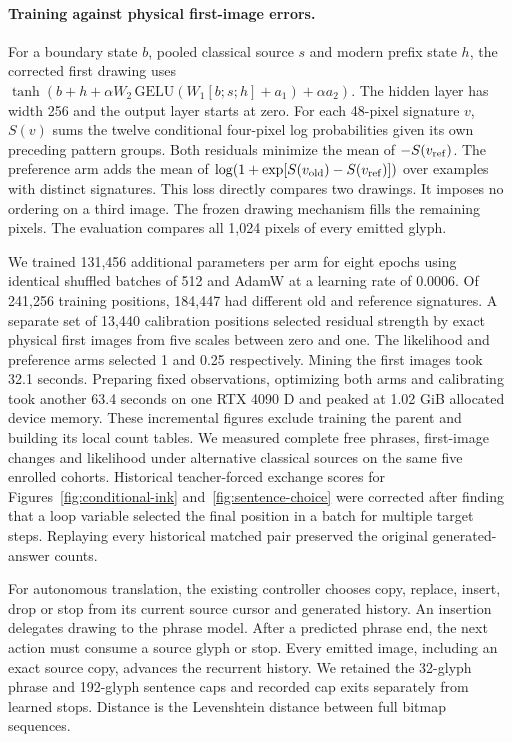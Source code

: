 \documentclass[12pt,a4paper]{article}
\providecommand{\DIFadd}[1]{{\protect\color{blue} \sf #1}} %
\begin{document}
\paragraph{\DIFadd{Training against physical first-image errors.}}
\DIFadd{For a boundary state $b$, pooled classical source $s$ and modern prefix state $h$, the corrected first drawing uses $\tanh(b+h+\alpha W_2\,\mathrm{GELU}(W_1[b;s;h]+a_1)+\alpha a_2)$. The hidden layer has width 256 and the output layer starts at zero. For each 48-pixel signature $v$, $S(v)$ sums the twelve conditional four-pixel log probabilities given its own preceding pattern groups. Both residuals minimize the mean of $-S(v_{\rm ref})$. The preference arm adds the mean of $\log(1+\exp[S(v_{\rm old})-S(v_{\rm ref})])$ over examples with distinct signatures. This loss directly compares two drawings. It imposes no ordering on a third image. The frozen drawing mechanism fills the remaining pixels. The evaluation compares all 1,024 pixels of every emitted glyph.
}

\DIFadd{We trained 131,456 additional parameters per arm for eight epochs using identical shuffled batches of 512 and AdamW at a learning rate of 0.0006. Of 241,256 training positions, 184,447 had different old and reference signatures. A separate set of 13,440 calibration positions selected residual strength by exact physical first images from five scales between zero and one. The likelihood and preference arms selected 1 and 0.25 respectively. Mining the first images took 32.1 seconds. Preparing fixed observations, optimizing both arms and calibrating took another 63.4 seconds on one RTX 4090 D and peaked at 1.02 GiB allocated device memory. These incremental figures exclude training the parent and building its local count tables. We measured complete free phrases, first-image changes and likelihood under alternative classical sources on the same five enrolled cohorts. Historical teacher-forced exchange scores for Figures~\ref{fig:conditional-ink} and~\ref{fig:sentence-choice} were corrected after finding that a loop variable selected the final position in a batch for multiple target steps. Replaying every historical matched pair preserved the original generated-answer counts.
}

\DIFadd{For autonomous translation, the existing controller chooses copy, replace, insert, drop or stop from its current source cursor and generated history. An insertion delegates drawing to the phrase model. After a predicted phrase end, the next action must consume a source glyph or stop. Every emitted image, including an exact source copy, advances the recurrent history. We retained the 32-glyph phrase and 192-glyph sentence caps and recorded cap exits separately from learned stops. Distance is the Levenshtein distance between full bitmap sequences.
}
\end{document}
